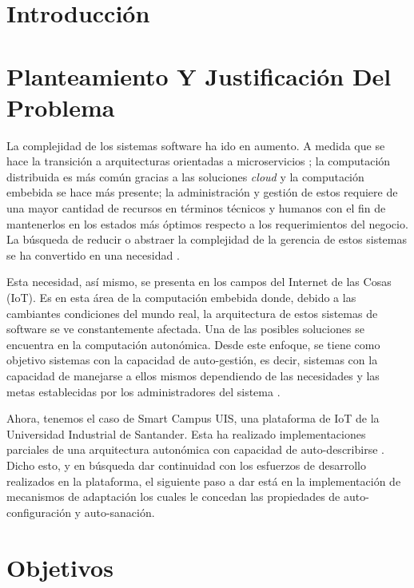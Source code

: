 \documentclass[12pt]{article}
\begin{document}
    
    
    \section{Introducción}

    

    \section{Planteamiento Y Justificación Del Problema}
    
    La complejidad de los sistemas software ha ido en aumento. A medida que se hace la transición a arquitecturas orientadas a microservicios \cite{forrester_research_2019}; la computación distribuida es más común gracias a las soluciones \textit{cloud} \cite{the_cloud_in_2021} y la computación embebida se hace más presente;  la administración y gestión de estos requiere de una mayor cantidad de recursos en términos técnicos y humanos con el fin de mantenerlos en los estados más óptimos respecto a los requerimientos del negocio. La búsqueda de reducir o abstraer la complejidad de la gerencia de estos sistemas se ha convertido en una necesidad \cite{lalanda_diaconescu_mccann_2014}.
    
    Esta necesidad, así mismo, se presenta en los campos del Internet de las Cosas (IoT). Es en esta área de la computación embebida donde, debido a las cambiantes condiciones del mundo real, la arquitectura de estos sistemas de software se ve constantemente afectada. Una de las posibles soluciones se encuentra en la computación autonómica. Desde este enfoque, se tiene como objetivo sistemas con la capacidad de auto-gestión, es decir, sistemas con la capacidad de manejarse a ellos mismos dependiendo de las necesidades y las metas establecidas por los administradores del sistema \cite{evaluation_2004}.
    
    Ahora, tenemos el caso de Smart Campus UIS, una plataforma de IoT de la Universidad Industrial de Santander. Esta ha realizado implementaciones parciales de una arquitectura autonómica con capacidad de auto-describirse \cite{henry_2020}. Dicho esto, y en búsqueda dar continuidad con los esfuerzos de desarrollo realizados en la plataforma, el siguiente paso a dar está en la implementación de mecanismos de adaptación los cuales le concedan las propiedades de auto-configuración y auto-sanación.

    \section{Objetivos}
\end{document}
